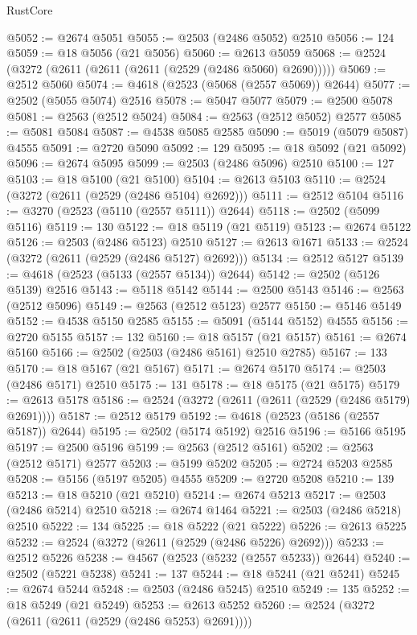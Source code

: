 \begin{lexlean}{RustCore}
\begin{coremodule}
@5052 := @2674 @5051
@5055 := @2503 (@2486 @5052) @2510
@5056 := 124
@5059 := @18 @5056 (@21 @5056)
@5060 := @2613 @5059
@5068 := @2524 (@3272 (@2611 (@2611 (@2611 (@2529 (@2486 @5060) @2690)))))
@5069 := @2512 @5060
@5074 := @4618 (@2523 (@5068 (@2557 @5069)) @2644)
@5077 := @2502 (@5055 @5074) @2516
@5078 := @5047 @5077
@5079 := @2500 @5078
@5081 := @2563 (@2512 @5024)
@5084 := @2563 (@2512 @5052) @2577
@5085 := @5081 @5084
@5087 := @4538 @5085 @2585
@5090 := @5019 (@5079 @5087) @4555
@5091 := @2720 @5090
@5092 := 129
@5095 := @18 @5092 (@21 @5092)
@5096 := @2674 @5095
@5099 := @2503 (@2486 @5096) @2510
@5100 := 127
@5103 := @18 @5100 (@21 @5100)
@5104 := @2613 @5103
@5110 := @2524 (@3272 (@2611 (@2529 (@2486 @5104) @2692)))
@5111 := @2512 @5104
@5116 := @3270 (@2523 (@5110 (@2557 @5111)) @2644)
@5118 := @2502 (@5099 @5116)
@5119 := 130
@5122 := @18 @5119 (@21 @5119)
@5123 := @2674 @5122
@5126 := @2503 (@2486 @5123) @2510
@5127 := @2613 @1671
@5133 := @2524 (@3272 (@2611 (@2529 (@2486 @5127) @2692)))
@5134 := @2512 @5127
@5139 := @4618 (@2523 (@5133 (@2557 @5134)) @2644)
@5142 := @2502 (@5126 @5139) @2516
@5143 := @5118 @5142
@5144 := @2500 @5143
@5146 := @2563 (@2512 @5096)
@5149 := @2563 (@2512 @5123) @2577
@5150 := @5146 @5149
@5152 := @4538 @5150 @2585
@5155 := @5091 (@5144 @5152) @4555
@5156 := @2720 @5155
@5157 := 132
@5160 := @18 @5157 (@21 @5157)
@5161 := @2674 @5160
@5166 := @2502 (@2503 (@2486 @5161) @2510 @2785)
@5167 := 133
@5170 := @18 @5167 (@21 @5167)
@5171 := @2674 @5170
@5174 := @2503 (@2486 @5171) @2510
@5175 := 131
@5178 := @18 @5175 (@21 @5175)
@5179 := @2613 @5178
@5186 := @2524 (@3272 (@2611 (@2611 (@2529 (@2486 @5179) @2691))))
@5187 := @2512 @5179
@5192 := @4618 (@2523 (@5186 (@2557 @5187)) @2644)
@5195 := @2502 (@5174 @5192) @2516
@5196 := @5166 @5195
@5197 := @2500 @5196
@5199 := @2563 (@2512 @5161)
@5202 := @2563 (@2512 @5171) @2577
@5203 := @5199 @5202
@5205 := @2724 @5203 @2585
@5208 := @5156 (@5197 @5205) @4555
@5209 := @2720 @5208
@5210 := 139
@5213 := @18 @5210 (@21 @5210)
@5214 := @2674 @5213
@5217 := @2503 (@2486 @5214) @2510
@5218 := @2674 @1464
@5221 := @2503 (@2486 @5218) @2510
@5222 := 134
@5225 := @18 @5222 (@21 @5222)
@5226 := @2613 @5225
@5232 := @2524 (@3272 (@2611 (@2529 (@2486 @5226) @2692)))
@5233 := @2512 @5226
@5238 := @4567 (@2523 (@5232 (@2557 @5233)) @2644)
@5240 := @2502 (@5221 @5238)
@5241 := 137
@5244 := @18 @5241 (@21 @5241)
@5245 := @2674 @5244
@5248 := @2503 (@2486 @5245) @2510
@5249 := 135
@5252 := @18 @5249 (@21 @5249)
@5253 := @2613 @5252
@5260 := @2524 (@3272 (@2611 (@2611 (@2529 (@2486 @5253) @2691))))

\end{coremodule}
\end{lexlean}
